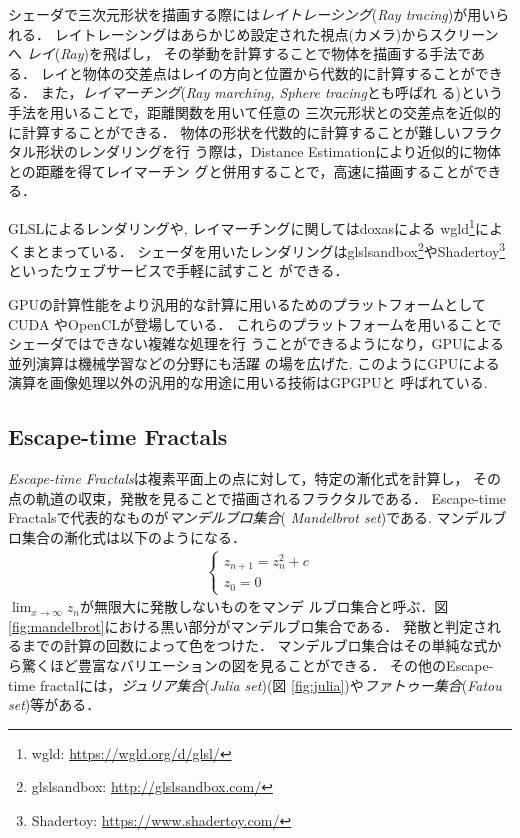 シェーダで三次元形状を描画する際には\emph{レイトレーシング}({\it Ray
tracing})が用いられる．
レイトレーシングはあらかじめ設定された視点(カメラ)からスクリーンへ
\emph{レイ}({\it Ray})を飛ばし，
その挙動を計算することで物体を描画する手法である．
レイと物体の交差点はレイの方向と位置から代数的に計算することができる．
また，\emph{レイマーチング}({\it Ray marching, Sphere tracing}とも呼ばれ
る)\cite{sphereTracing}という手法を用いることで，距離関数を用いて任意の
三次元形状との交差点を近似的に計算することができる．
物体の形状を代数的に計算することが難しいフラクタル形状のレンダリングを行
う際は，Distance Estimationにより近似的に物体との距離を得てレイマーチン
グと併用することで，高速に描画することができる．

GLSLによるレンダリングや, レイマーチングに関してはdoxasによる
wgld\footnote{wgld: \url{https://wgld.org/d/glsl/}}によくまとまっている．
シェーダを用いたレンダリングはglslsandbox\footnote{glslsandbox:
\url{http://glslsandbox.com/}}やShadertoy\footnote{Shadertoy:
\url{https://www.shadertoy.com/}}といったウェブサービスで手軽に試すこと
ができる．

GPUの計算性能をより汎用的な計算に用いるためのプラットフォームとしてCUDA
やOpenCLが登場している．
これらのプラットフォームを用いることでシェーダではできない複雑な処理を行
うことができるようになり，GPUによる並列演算は機械学習などの分野にも活躍
の場を広げた.
このようにGPUによる演算を画像処理以外の汎用的な用途に用いる技術はGPGPUと
呼ばれている.

\subsection{Escape-time Fractals}
{\it Escape-time Fractals}は複素平面上の点に対して，特定の漸化式を計算し，
その点の軌道の収束，発散を見ることで描画されるフラクタルである．
Escape-time Fractalsで代表的なものが\emph{マンデルブロ集合}({\it
Mandelbrot set})である.
マンデルブロ集合の漸化式は以下のようになる．
\begin{eqnarray*}
 \begin{cases}
  z_{n+1} = z^2_{n} + c \\ z_0 = 0
 \end{cases}
\end{eqnarray*}
$\displaystyle \lim_{x \to \infty} z_n$が無限大に発散しないものをマンデ
ルブロ集合と呼ぶ．図\ref{fig:mandelbrot}における黒い部分がマンデルブロ集合である．
発散と判定されるまでの計算の回数によって色をつけた．
マンデルブロ集合はその単純な式から驚くほど豊富なバリエーションの図を見ることができる．
その他のEscape-time fractalには，\emph{ジュリア集合}({\it Julia set})(図
\ref{fig:julia})や\emph{ファトゥー集合}({\it Fatou set})等がある．

